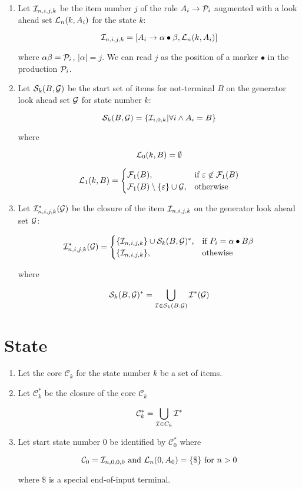 \begin{enumerate}
\item   Let $\I_{n,i,j,k}$ be the item number $j$ of the rule
	$A_i \rightarrow \P_i$ augmented with a look ahead set
	$\L_n(k,A_i)$ for the state $k$:

	$$
	\I_{n,i,j,k} = [ A_i \rightarrow \alpha \bullet \beta, \L_n(k,A_i) ]
	$$

	where $\alpha \beta = \P_i$, $|\alpha| = j$. We can read $j$ as
	the position of a marker $\bullet$ in the production $\P_i$.

\item	Let $\S_k(B,\G)$ be the start set of items for not-terminal $B$
	on the generator look ahead set $\G$ for state number $k$:

	$$
	\S_k(B,\G) = \{ \I_{i,0,k} | \forall i \wedge A_i = B \}
	$$

	where

	$$
	\L_0(k,B) = \emptyset
	$$

	$$
	\L_1(k,B) =
	\begin{cases}
		\F_1(B), & \text{if } \e \not \in \F_1(B) \\
		\F_1(B) \setminus \{ \e \} \cup \G, & \text{otherwise}
	\end{cases}
	$$

\item	Let $\I_{n,i,j,k}^*(\G)$ be the closure of the item $\I_{n,i,j,k}$
	on the generator look ahead set $\G$:

	$$
	\I_{n,i,j,k}^*(\G) =
	\begin{cases}
	\{ \I_{n,i,j,k} \} \cup \S_k(B,\G)^* \text, &
		\text{if } P_i = \alpha \bullet B \beta \\
	\{ \I_{n,i,j,k} \} \text, & \text{othewise}
	\end{cases}
	$$

	where

	$$
	\S_k(B,\G)^* = \bigcup_{\I \in \S_k(B,\G)} \I^*(\G)
	$$
\end{enumerate}

\section{State}
\def\C{\mathcal{C}}
\def\eoi{\text{\$}}

\begin{enumerate}
\item	Let the core $\C_k$ for the state number $k$ be a set of items.

\item	Let $\C_k^*$ be the closure of the core $\C_k$

	$$
	\C_k^* = \bigcup_{\I \in C_k} \I^*
	$$

\item	Let start state number $0$ be identified by $\C_0^*$ where

	$$
	\C_0 = \I_{n,0,0,0} \text{ and }
	\L_n(0,A_0) = \{ \eoi \} \text{ for } n > 0
	$$

	where $\eoi$ is a special end-of-input terminal.
\end{enumerate}

